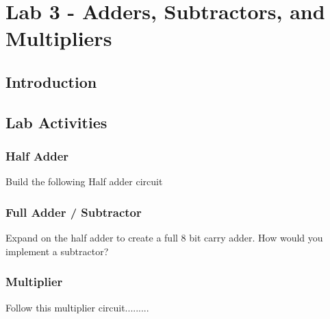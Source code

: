 \section{Lab 3 - Adders, Subtractors, and Multipliers}

\subsection{Introduction}

\subsection{Lab Activities}

\subsubsection{Half Adder}
Build the following Half adder circuit

\subsubsection{Full Adder / Subtractor}
Expand on the half adder to create a full 8 bit carry adder. How would you implement a subtractor?

\subsubsection{Multiplier}
Follow this multiplier circuit.........